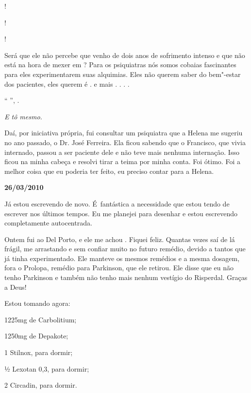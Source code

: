 !

!

!

Será que ele não percebe que venho de dois anos de sofrimento intenso e
que não está na hora de mexer em  ? Para os psiquiatras nós
somos cobaias fascinantes para eles experimentarem suas alquimias. Eles
não querem saber do bem"-estar dos pacientes, eles querem é 
.  e mais . . . .

`` '',  .

\emph{E tô mesmo.}

Daí, por iniciativa própria, fui consultar um psiquiatra que a Helena me
sugeriu no ano passado, o Dr. José Ferreira. Ela ficou sabendo que o
Francisco, que vivia internado, passou a ser paciente dele e não teve
mais nenhuma internação. Isso ficou na minha cabeça e resolvi tirar a
teima por minha conta. Foi ótimo. Foi a melhor coisa que eu poderia ter
feito, eu preciso contar para a Helena.

\begin{center}\textbf{\asterisc{}}\end{center}


\begin{flushright}\textbf{26/03/2010}\end{flushright}


Já estou escrevendo de novo. É~fantástica a necessidade que estou tendo
de escrever nos últimos tempos. Eu me planejei para desenhar e estou
escrevendo completamente autocentrada.

Ontem fui ao Del Porto, e ele me achou . Fiquei feliz. Quantas
vezes saí de lá frágil, me arrastando e sem confiar muito no futuro
remédio, devido a tantos que já tinha experimentado. Ele manteve os
mesmos remédios e a mesma dosagem, fora o Prolopa, remédio para
Parkinson, que ele retirou. Ele disse que eu não tenho Parkinson e
também não tenho mais nenhum vestígio do Risperdal. Graças a Deus!

Estou tomando agora:

1225mg de Carbolitium;

1250mg de Depakote;

1 Stilnox, para dormir;

½ Lexotan 0,3, para dormir;

2 Circadin, para dormir.

